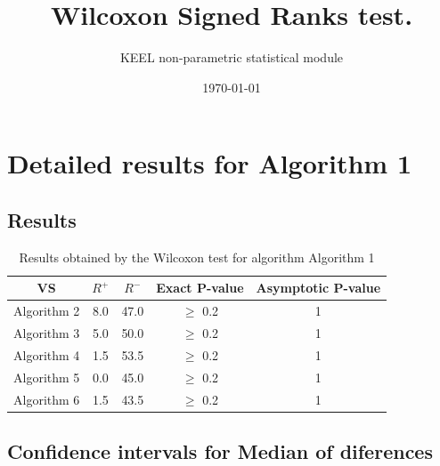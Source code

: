 \documentclass[a4paper,10pt]{article}
\title{Wilcoxon Signed Ranks test.}
\date{\today}
\author{KEEL non-parametric statistical module}
\begin{document}
\pagestyle{empty}
\maketitle
\thispagestyle{empty}



\section{Detailed results for Algorithm 1}


\subsection{Results}

\begin{table}[!htp]
\centering\small
\begin{tabular}{
|c|c|c|c|c|}
\hline
 VS & $R^{+}$ & $R^{-}$ & Exact P-value & Asymptotic P-value \\ \hline 
Algorithm 2 & 8.0 & 47.0 & $\geq$ 0.2 & 1\\ \hline 
Algorithm 3 & 5.0 & 50.0 & $\geq$ 0.2 & 1\\ \hline 
Algorithm 4 & 1.5 & 53.5 & $\geq$ 0.2 & 1\\ \hline 
Algorithm 5 & 0.0 & 45.0 & $\geq$ 0.2 & 1\\ \hline 
Algorithm 6 & 1.5 & 43.5 & $\geq$ 0.2 & 1\\ \hline 

\end{tabular}
\caption{Results obtained by the Wilcoxon test for algorithm Algorithm 1}
\end{table}

\subsection{Confidence intervals for Median of diferences}
\end{document}
